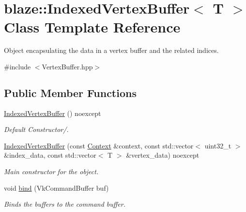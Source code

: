 \hypertarget{classblaze_1_1IndexedVertexBuffer}{}\section{blaze\+:\+:Indexed\+Vertex\+Buffer$<$ T $>$ Class Template Reference}
\label{classblaze_1_1IndexedVertexBuffer}


Object encapsulating the data in a vertex buffer and the related indices.  




{\ttfamily \#include $<$Vertex\+Buffer.\+hpp$>$}

\subsection*{Public Member Functions}
\begin{DoxyCompactItemize}
\item 
\mbox{\label{classblaze_1_1IndexedVertexBuffer_a3caf7bf67c51082014bc299fc483cfe8}} 
\hyperlink{classblaze_1_1IndexedVertexBuffer_a3caf7bf67c51082014bc299fc483cfe8}{Indexed\+Vertex\+Buffer} () noexcept
\begin{DoxyCompactList}\small\item\em Default Constructor/. \end{DoxyCompactList}\item 
\hyperlink{classblaze_1_1IndexedVertexBuffer_a569c5890b3b517a4d08b6bc46e1ec71c}{Indexed\+Vertex\+Buffer} (const \hyperlink{classblaze_1_1Context}{Context} \&context, const std\+::vector$<$ uint32\+\_\+t $>$ \&index\+\_\+data, const std\+::vector$<$ T $>$ \&vertex\+\_\+data) noexcept
\begin{DoxyCompactList}\small\item\em Main constructor for the object. \end{DoxyCompactList}\item 
void \hyperlink{classblaze_1_1IndexedVertexBuffer_a9b418a8f1c685c8326b4531afbcf2dbd}{bind} (Vk\+Command\+Buffer buf)
\begin{DoxyCompactList}\small\item\em Binds the buffers to the command buffer. \end{DoxyCompactList}\end{DoxyCompactItemize}
